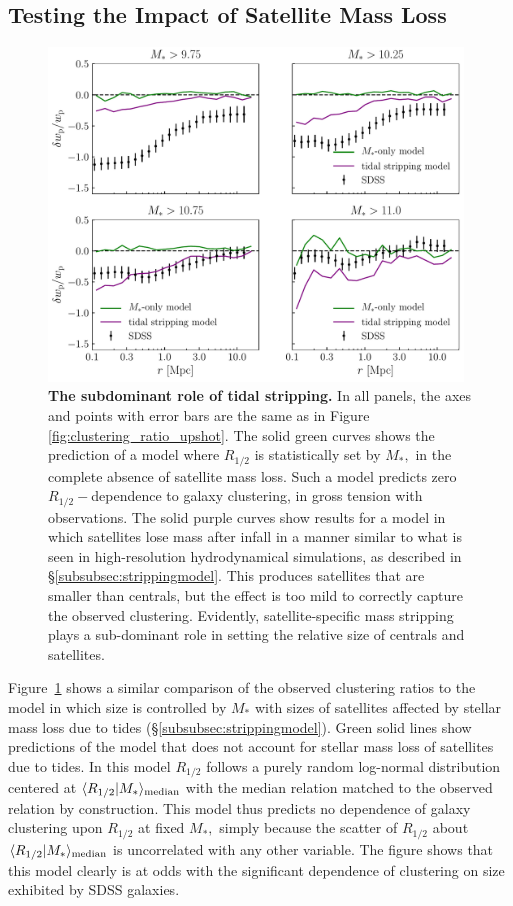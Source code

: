 \documentclass[usenatbib,usegraphicx,letterpaper]{mn2e}
\newcommand{\rhalf}{R_{1/2}}
\newcommand{\mstar}{M_{\ast}}
\newcommand{\median}[2]{\langle{#1}\vert{#2}\rangle_{\rm median}}
\begin{document}
\subsection{Testing the Impact of Satellite Mass Loss}
\label{subsec:mstar_stripping}
\begin{figure}
\centering
\includegraphics[width=11cm]{FIGS/alt_model_wp_ratios.pdf}
\caption{
{\bf The subdominant role of tidal stripping.}
In all panels, the axes and points with error bars are the same as in Figure \ref{fig:clustering_ratio_upshot}. The solid green curves shows the prediction of a model where $\rhalf$ is statistically set by $\mstar,$ in the complete absence of satellite mass loss. Such a model predicts zero $\rhalf-$dependence to galaxy clustering, in gross tension with observations. The solid purple curves show results for a model in which satellites lose mass after infall in a manner similar to what is seen in high-resolution hydrodynamical simulations, as described in \S\ref{subsubsec:strippingmodel}. This produces satellites that are smaller than centrals, but the effect is too mild to correctly capture the observed clustering. Evidently, satellite-specific mass stripping plays a sub-dominant role in setting the relative size of centrals and satellites.
}
\label{fig:mstarmodelclustering}
\end{figure}

Figure~\ref{fig:mstarmodelclustering} shows a similar comparison of the observed clustering ratios to the model
in which size is controlled by $\mstar$ with sizes of satellites affected by stellar mass loss due to tides (\S\ref{subsubsec:strippingmodel}). Green solid lines show predictions of the model that does not account for stellar
mass loss of satellites due to tides. In this model $\rhalf$ follows a purely random log-normal distribution centered at $\median{\rhalf}{\mstar}$ with the median relation matched to the observed relation by construction.  This model thus predicts no dependence of galaxy clustering upon $\rhalf$ at fixed $\mstar,$ simply because the scatter of $\rhalf$ about $\median{\rhalf}{\mstar}$ is uncorrelated with any other variable. The figure shows that this model clearly is at odds with the significant dependence of clustering on size exhibited by SDSS galaxies.
\end{document}
